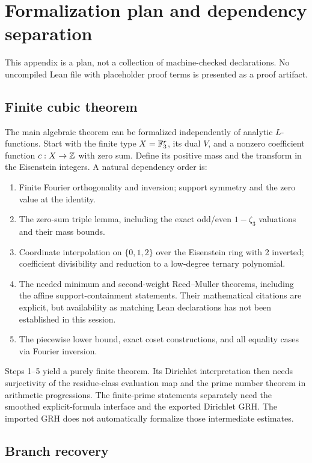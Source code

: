 \section{Formalization plan and dependency separation}
\label{sec:formalization}

This appendix is a plan, not a collection of machine-checked declarations.
No uncompiled Lean file with placeholder proof terms is presented as a
proof artifact.

\subsection{Finite cubic theorem}

The main algebraic theorem can be formalized independently of analytic
$L$-functions. Start with the finite type $X=\mathbb F_3^r$, its dual $V$, and
a nonzero coefficient function $c:X\to\mathbb Z$ with zero sum. Define its
positive mass and the transform in the Eisenstein integers. A natural
dependency order is:
\begin{enumerate}
\item Finite Fourier orthogonality and inversion; support symmetry and
the zero value at the identity.
\item The zero-sum triple lemma, including the exact odd/even
$1-\zeta_3$ valuations and their mass bounds.
\item Coordinate interpolation on $\{0,1,2\}$ over the Eisenstein ring
with 2 inverted; coefficient divisibility and reduction to a low-degree
ternary polynomial.
\item The needed minimum and second-weight Reed--Muller theorems,
including the affine support-containment statements. Their mathematical
citations are explicit, but availability as matching Lean declarations
has not been established in this session.
\item The piecewise lower bound, exact coset constructions, and all
equality cases via Fourier inversion.
\end{enumerate}
Steps 1--5 yield a purely finite theorem. Its Dirichlet interpretation
then needs surjectivity of the residue-class evaluation map and the prime
number theorem in arithmetic progressions. The finite-prime statements
separately need the smoothed explicit-formula interface and the exported
Dirichlet GRH. The imported GRH does not automatically formalize those
intermediate estimates.

\subsection{Branch recovery}

